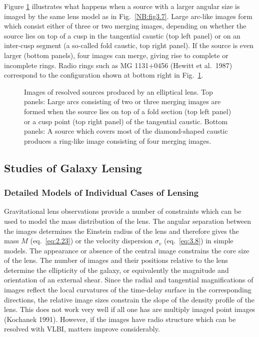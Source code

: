 \documentclass[a4paper,10pt]{article} %
\begin{document}
Figure \ref{NB:fig3.8} illustrates what happens when a source with a
larger angular size is imaged by the same lens model as in Fig.\
\ref{NB:fig3.7}. Large arc-like images form which consist either of
three or two merging images, depending on whether the source lies on
top of a cusp in the tangential caustic (top left panel) or on an
inter-cusp segment (a so-called fold caustic, top right panel). If the
source is even larger (bottom panels), four images can merge, giving
rise to complete or incomplete rings. Radio rings such as MG
1131$+$0456 (Hewitt et al.\ 1987) correspond to the configuration
shown at bottom right in Fig.\ \ref{NB:fig3.8}.

\begin{figure}[ht] %
\begin{center}
\begin{minipage}[t]{0.6\hsize}
\end{minipage}
\end{center}
\caption{Images of resolved sources produced by an elliptical
  lens. Top panels: Large arcs consisting of two or three merging
  images are formed when the source lies on top of a fold section (top
  left panel) or a cusp point (top right panel) of the tangential
  caustic. Bottom panels: A source which covers most of the
  diamond-shaped caustic produces a ring-like image consisting of four
  merging images.}
\label{NB:fig3.8}
\end{figure}

\subsection{Studies of Galaxy Lensing}
\label{NB:subsect3.6}

\subsubsection{Detailed Models of Individual Cases of Lensing}
\label{NB:subsubsect3.6.1}

Gravitational lens observations provide a number of constraints which
can be used to model the mass distribution of the lens. The angular
separation between the images determines the Einstein radius of the
lens and therefore gives the mass $M$ (eq.\ \ref{eq:2.23}) or the
velocity dispersion $\sigma_v$ (eq.\ \ref{eq:3.8}) in simple
models. The appearance or absence of the central image constrains the
core size of the lens. The number of images and their positions
relative to the lens determine the ellipticity of the galaxy, or
equivalently the magnitude and orientation of an external shear. Since
the radial and tangential magnifications of images reflect the local
curvatures of the time-delay surface in the corresponding directions,
the relative image sizes constrain the slope of the density profile of
the lens. This does not work very well if all one has are multiply
imaged point images (Kochanek 1991). However, if the images have radio
structure which can be resolved with VLBI, matters improve
considerably.
\end{document}
